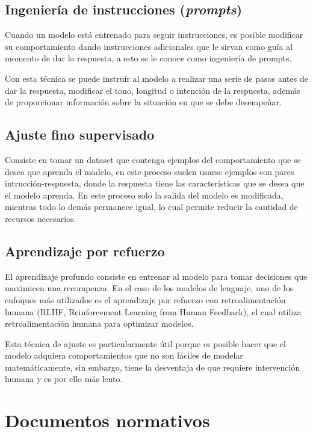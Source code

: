 \subsection{Ingeniería de instrucciones (\textit{prompts})}

Cuando un modelo está entrenado para seguir instrucciones, es posible modificar
su comportamiento dando instrucciones adicionales que le sirvan como guía
al momento de dar la respuesta, a esto se le conoce como ingeniería de prompts.

Con esta técnica se puede instruir al modelo a realizar una serie de pasos
antes de dar la respuesta, modificar el tono, longitud o intención de la
respuesta, además de proporcionar información sobre la situación en que
se debe desempeñar.

\subsection{Ajuste fino supervisado}

Consiste en tomar un dataset que contenga ejemplos del comportamiento que
se desea que aprenda el modelo, en este proceso suelen usarse
ejemplos con pares intrucción-respuesta, donde la respuesta tiene
las características que se desea que el modelo aprenda. En este proceso
solo la salida del modelo es modificada, mientras todo lo demás permanece
igual, lo cual permite reducir la cantidad de recursos necesarios.

\subsection{Aprendizaje por refuerzo}

El aprendizaje profundo consiste en entrenar al modelo para tomar decisiones
que maximicen una recompenza. En el caso de los modelos de lenguaje, uno
de los enfoques más utilizados es el aprendizaje por refuerzo con
retroalimentación humana (RLHF, Reinforcement Learning from Human Feedback),
el cual utiliza retroalimentación humana para optimizar modelos.

Esta técnica de ajuste es particularmente útil porque es posible hacer que
el modelo adquiera comportamientos que no son fáciles de modelar matemáticamente,
sin embargo, tiene la desventaja de que requiere intervención humana y es por
ello más lento.

\section{Documentos normativos}

